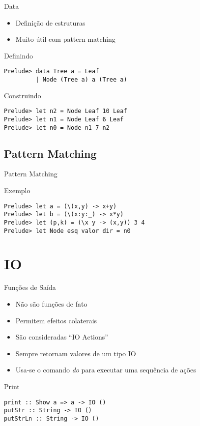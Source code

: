 \documentclass{beamer}
\begin{document}
		\begin{frame}[fragile]{Data}
		 
		 \begin{itemize}
		  \item Definição de estruturas
		  \item Muito útil com pattern matching
		 \end{itemize}
		 
		 \begin{block}{Definindo}
		  \begin{lstlisting}
Prelude> data Tree a = Leaf 
         | Node (Tree a) a (Tree a)
		  \end{lstlisting}
		 \end{block}		 
		 \begin{block}{Construindo}
		  \begin{lstlisting}
Prelude> let n2 = Node Leaf 10 Leaf
Prelude> let n1 = Node Leaf 6 Leaf
Prelude> let n0 = Node n1 7 n2
		  \end{lstlisting}
		 \end{block}
		\end{frame}
		
		\subsection{Pattern Matching}
	
		\begin{frame}[fragile]{Pattern Matching}	 
		 \begin{block}{Exemplo}
		  \begin{lstlisting}
Prelude> let a = (\(x,y) -> x+y)
Prelude> let b = (\(x:y:_) -> x*y)
Prelude> let (p,k) = (\x y -> (x,y)) 3 4
Prelude> let Node esq valor dir = n0
		  \end{lstlisting}
		 \end{block}
		\end{frame}
	
	\section{IO}
	
		\begin{frame}[fragile]{Funções de Saída}
		 \begin{itemize}
		  \item Não são funções de fato
		  \item Permitem efeitos colaterais
		  \item São consideradas ``IO Actions''
		  \item Sempre retornam valores de um tipo IO
		  \item Usa-se o comando \textit{do} para executar uma sequência de ações
		 \end{itemize}
		 
		 \begin{block}{Print}
		  \begin{lstlisting}
print :: Show a => a -> IO ()
putStr :: String -> IO ()
putStrLn :: String -> IO ()
		  \end{lstlisting}
		 \end{block}
		\end{frame}
		
\end{document}
